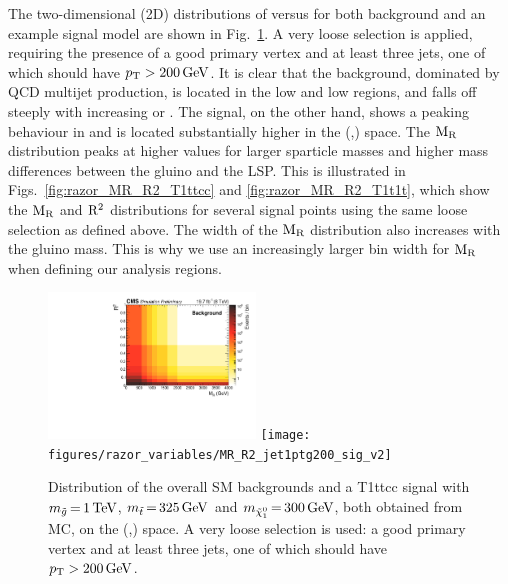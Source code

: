 The two-dimensional (2D) distributions of \rsq versus \mr for both background and an example signal
model are shown in Fig.~\ref{fig:razor_MR_Rsq_bg_signal}. A very loose selection is applied,
requiring the presence of a good primary vertex and at least three jets, one of which should have
$p_{\mathrm{T}} > 200\,\text{Ge\hspace{-.08em}V}$. It is clear that the background, dominated by QCD multijet production, is located
in the low \mr and low \rsq regions, and falls off steeply with increasing \mr or \rsq.
The signal, on the other hand, shows a peaking behaviour in \mr and is located substantially higher
in the (\mr,\rsq) space. 
The $\mathrm{M_R}$ distribution peaks at higher values for larger sparticle masses and higher mass
differences between the gluino and the LSP. This is illustrated
in Figs.~\ref{fig:razor_MR_R2_T1ttcc} and \ref{fig:razor_MR_R2_T1t1t}, which show the $\mathrm{M_R}$ and
$\mathrm{R^2}$ distributions for several signal points using the same loose selection as defined above.
The width of the $\mathrm{M_R}$ distribution also increases with the gluino mass. This is why we use an
increasingly larger bin width for $\mathrm{M_R}$ when defining our analysis regions. 


\begin{figure}[htpb]
\centering
\includegraphics[width=0.49\textwidth]{figures/razor_variables/MR_R2_jet1ptg200_bg_v2} 
\texttt{[image: figures/razor\_variables/MR\_R2\_jet1ptg200\_sig\_v2]}
\caption{Distribution of the overall SM backgrounds and a T1ttcc signal with $m_{\tilde{g}} \,{=}\,
1\,\text{Te\hspace{-.08em}V}$, $m_{\tilde{t}} \,{=}\, 325\,\text{Ge\hspace{-.08em}V}$ and $m_{\tilde{\chi}_1^0} \,{=}\, 300\,\text{Ge\hspace{-.08em}V}$, both obtained
from MC, on the (\mr,\rsq) space. A very loose selection is used:  a good primary vertex and at
least three jets, one of which should have $p_{\mathrm{T}} > 200\,\text{Ge\hspace{-.08em}V}$. 
\label{fig:razor_MR_Rsq_bg_signal}}
\end{figure}

